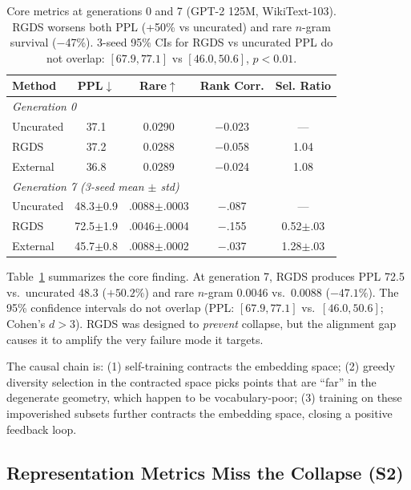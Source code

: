\documentclass[11pt,a4paper]{article}
\begin{document}
\begin{table}[t]
\centering
\small
\begin{tabular}{lcccc}
\toprule
\textbf{Method} & \textbf{PPL}$\downarrow$ & \textbf{Rare}$\uparrow$ & \textbf{Rank Corr.} & \textbf{Sel. Ratio} \\
\midrule
\multicolumn{5}{l}{\textit{Generation 0}} \\
Uncurated & 37.1 & 0.0290 & $-$0.023 & --- \\
RGDS & 37.2 & 0.0288 & $-$0.058 & 1.04 \\
External & 36.8 & 0.0289 & $-$0.024 & 1.08 \\
\midrule
\multicolumn{5}{l}{\textit{Generation 7 (3-seed mean $\pm$ std)}} \\
Uncurated & 48.3{\scriptsize$\pm$0.9} & .0088{\scriptsize$\pm$.0003} & $-$.087 & --- \\
RGDS & 72.5{\scriptsize$\pm$1.9} & .0046{\scriptsize$\pm$.0004} & $-$.155 & 0.52{\scriptsize$\pm$.03} \\
External & 45.7{\scriptsize$\pm$0.8} & .0088{\scriptsize$\pm$.0002} & $-$.037 & 1.28{\scriptsize$\pm$.03} \\
\bottomrule
\end{tabular}
\caption{Core metrics at generations 0 and 7 (GPT-2 125M, WikiText-103). RGDS worsens both PPL (+50\% vs uncurated) and rare $n$-gram survival ($-$47\%). 3-seed 95\% CIs for RGDS vs uncurated PPL do not overlap: $[67.9, 77.1]$ vs $[46.0, 50.6]$, $p < 0.01$.}
\label{tab:main_full}
\end{table}

Table~\ref{tab:main_full} summarizes the core finding.
At generation 7, RGDS produces PPL 72.5 vs.\ uncurated 48.3 ($+50.2\%$) and rare $n$-gram 0.0046 vs.\ 0.0088 ($-47.1\%$).
The 95\% confidence intervals do not overlap (PPL: $[67.9, 77.1]$ vs.\ $[46.0, 50.6]$; Cohen's $d > 3$).
RGDS was designed to \emph{prevent} collapse, but the alignment gap causes it to amplify the very failure mode it targets.

The causal chain is: (1) self-training contracts the embedding space; (2) greedy diversity selection in the contracted space picks points that are ``far'' in the degenerate geometry, which happen to be vocabulary-poor; (3) training on these impoverished subsets further contracts the embedding space, closing a positive feedback loop.

\subsection{Representation Metrics Miss the Collapse (S2)}
\end{document}
